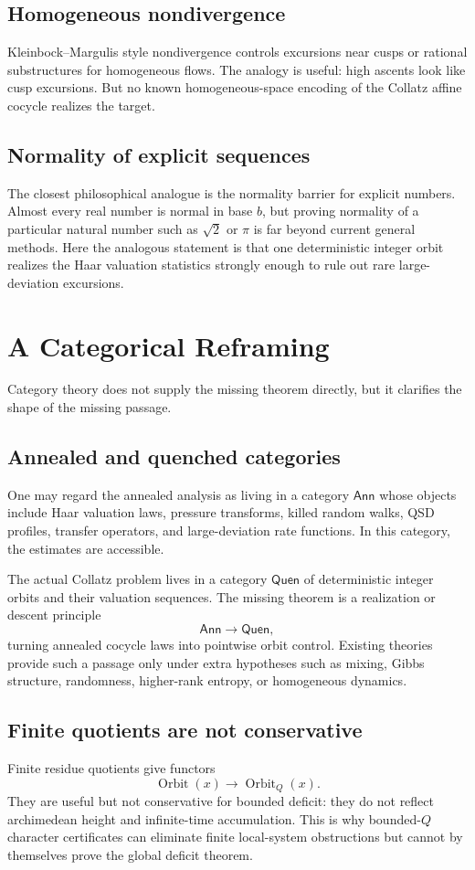 \documentclass[11pt]{article}
\begin{document}
\subsection{Homogeneous nondivergence}
Kleinbock--Margulis style nondivergence controls excursions near cusps or rational substructures for homogeneous flows.  The analogy is useful: high ascents look like cusp excursions.  But no known homogeneous-space encoding of the Collatz affine cocycle realizes the target.

\subsection{Normality of explicit sequences}
The closest philosophical analogue is the normality barrier for explicit numbers.  Almost every real number is normal in base $b$, but proving normality of a particular natural number such as $\sqrt2$ or $\pi$ is far beyond current general methods.  Here the analogous statement is that one deterministic integer orbit realizes the Haar valuation statistics strongly enough to rule out rare large-deviation excursions.

\section{A Categorical Reframing}

Category theory does not supply the missing theorem directly, but it clarifies the shape of the missing passage.

\subsection{Annealed and quenched categories}
One may regard the annealed analysis as living in a category $\mathsf{Ann}$ whose objects include Haar valuation laws, pressure transforms, killed random walks, QSD profiles, transfer operators, and large-deviation rate functions.  In this category, the estimates are accessible.

The actual Collatz problem lives in a category $\mathsf{Quen}$ of deterministic integer orbits and their valuation sequences.  The missing theorem is a realization or descent principle
\[
\mathsf{Ann}\longrightarrow\mathsf{Quen},
\]
turning annealed cocycle laws into pointwise orbit control.  Existing theories provide such a passage only under extra hypotheses such as mixing, Gibbs structure, randomness, higher-rank entropy, or homogeneous dynamics.

\subsection{Finite quotients are not conservative}
Finite residue quotients give functors
\[
\operatorname{Orbit}(x)\longrightarrow \operatorname{Orbit}_Q(x).
\]
They are useful but not conservative for bounded deficit: they do not reflect archimedean height and infinite-time accumulation.  This is why bounded-$Q$ character certificates can eliminate finite local-system obstructions but cannot by themselves prove the global deficit theorem.
\end{document}
